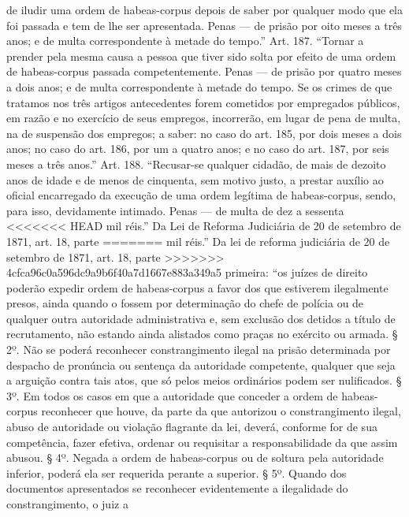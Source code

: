 {  de iludir uma ordem de habeas-corpus depois de saber por qualquer modo
  que ela foi passada e tem de lhe ser apresentada. Penas --- de prisão
  por oito meses a três anos; e de multa correspondente à metade do
  tempo.'' Art. 187. ``Tornar a prender pela mesma causa a pessoa que
  tiver sido solta por efeito de uma ordem de habeas-corpus passada
  competentemente. Penas --- de prisão por quatro meses a dois anos; e de
  multa correspondente à metade do tempo. Se os crimes de que tratamos
  nos três artigos antecedentes forem cometidos por empregados
  públicos, em razão e no exercício de seus empregos, incorrerão, em
  lugar de pena de multa, na de suspensão dos empregos; a saber: no caso
  do art. 185, por dois meses a dois anos; no caso do art. 186, por um a
  quatro anos; e no caso do art. 187, por seis meses a três anos.'' Art.
  188. ``Recusar-se qualquer cidadão, de mais de dezoito anos de idade e
  de menos de cinquenta, sem motivo justo, a prestar auxílio ao oficial
  encarregado da execução de uma ordem legítima de habeas-corpus, sendo,
  para isso, devidamente intimado. Penas --- de multa de dez a sessenta
<<<<<<< HEAD
  mil réis.'' Da Lei de Reforma Judiciária de 20 de setembro de 1871, art. 18, parte
=======
  mil réis.'' Da lei de reforma judiciária de 20 de setembro de 1871, art. 18, parte
>>>>>>> 4cfca96c0a596dc9a9b6f40a7d1667e883a349a5
  primeira: ``os juízes de direito poderão expedir ordem de
  habeas-corpus a favor dos que estiverem ilegalmente presos, ainda
  quando o fossem por determinação do chefe de polícia ou de qualquer
  outra autoridade administrativa e, sem exclusão dos detidos a título
  de recrutamento, não estando ainda alistados como praças no exército
  ou armada. § 2º. Não se poderá reconhecer constrangimento ilegal na
  prisão determinada por despacho de pronúncia ou sentença da autoridade
  competente, qualquer que seja a arguição contra tais atos, que só
  pelos meios ordinários podem ser nulificados. § 3º. Em todos os casos
  em que a autoridade que conceder a ordem de habeas-corpus reconhecer
  que houve, da parte da que autorizou o constrangimento ilegal, abuso
  de autoridade ou violação flagrante da lei, deverá, conforme for de
  sua competência, fazer efetiva, ordenar ou requisitar a
  responsabilidade da que assim abusou. § 4º. Negada a ordem de
  habeas-corpus ou de soltura pela autoridade inferior, poderá ela ser
  requerida perante a superior. § 5º. Quando dos documentos apresentados
  se reconhecer evidentemente a ilegalidade do constrangimento, o juiz a
}
